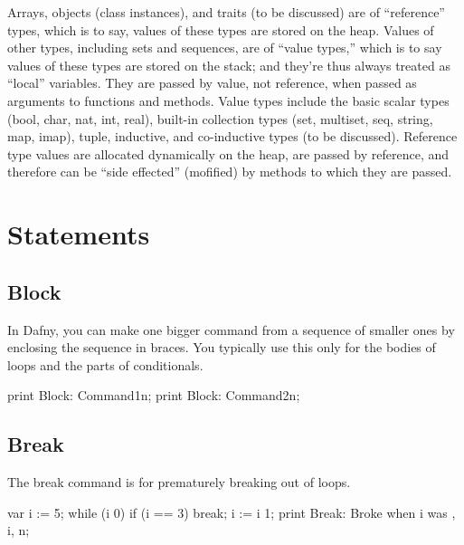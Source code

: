 \documentclass[letterpaper,10pt,english]{sphinxmanual}
\begin{document}
Arrays, objects (class instances), and traits (to be discussed) are of
“reference” types, which is to say, values of these types are stored
on the heap. Values of other types, including sets and sequences, are
of “value types,” which is to say values of these types are stored on
the stack; and they’re thus always treated as “local” variables. They
are passed by value, not reference, when passed as arguments to
functions and methods. Value types include the basic scalar types
(bool, char, nat, int, real), built-in collection types (set,
multiset, seq, string, map, imap), tuple, inductive, and co-inductive
types (to be discussed).  Reference type values are allocated
dynamically on the heap, are passed by reference, and therefore can be
“side effected” (mofified) by methods to which they are passed.


\section{Statements}
\label{\detokenize{06-dafny-language:statements}}

\subsection{Block}
\label{\detokenize{06-dafny-language:block}}
In Dafny, you can make one bigger command from a sequence of smaller
ones by enclosing the sequence in braces. You typically use this only
for the bodies of loops and the parts of conditionals.

\begin{sphinxVerbatim}[commandchars=\\\{\}]
\PYGZob{}
    print \PYGZdq{}Block: Command1\PYGZbs{}n\PYGZdq{};
    print \PYGZdq{}Block: Command2\PYGZbs{}n\PYGZdq{};
\PYGZcb{}
\end{sphinxVerbatim}


\subsection{Break}
\label{\detokenize{06-dafny-language:break}}
The break command is for prematurely breaking out of loops.

\begin{sphinxVerbatim}[commandchars=\\\{\}]
var i := 5;
while (i \PYGZgt{} 0)
\PYGZob{}
    if (i == 3)
    \PYGZob{}
        break;
    \PYGZcb{}
    i := i \PYGZhy{} 1;
\PYGZcb{}
print \PYGZdq{}Break: Broke when i was \PYGZdq{}, i, \PYGZdq{}\PYGZbs{}n\PYGZdq{};
\end{sphinxVerbatim}
\end{document}
